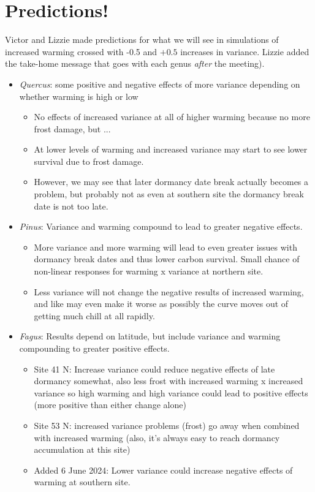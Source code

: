 \documentclass[11pt,letter]{article}
\begin{document}
\section{Predictions!}

Victor and Lizzie made predictions for what we will see in simulations of increased warming crossed with -0.5 and $+0.5$ increases in variance. Lizzie added the take-home message that goes with each genus \emph{after} the meeting). 

\begin{itemize}
\item \emph{Quercus}: some positive and negative effects of more variance depending on whether warming is high or low
\begin{itemize}
\item No effects of increased variance at all of higher warming because no more frost damage, but ...
\item At lower levels of warming and increased variance may start to see lower survival due to frost damage. 
\item However, we may see that later dormancy date break actually becomes a problem, but probably not as even at southern site the dormancy break date is not too late.
\end{itemize}
\item \emph{Pinus}: Variance and warming compound to lead to greater negative effects. 
\begin{itemize}
\item More variance and more warming will lead to even greater issues with dormancy break dates and thus lower carbon survival. Small chance of non-linear responses for warming x variance at northern site.
\item Less variance will not change the negative results of increased warming, and like may even make it worse as possibly the curve moves out of getting much chill at all rapidly. 
\end{itemize}
\item \emph{Fagus}: Results depend on latitude, but include variance and warming compounding to greater positive effects. 
\begin{itemize}
\item Site 41 N: Increase variance could reduce negative effects of late dormancy somewhat, also less frost with increased warming x increased variance so high warming and high variance could lead to positive effects (more positive than either change alone)
\item Site 53 N: increased variance problems (frost) go away when combined with increased warming (also, it's always easy to reach dormancy accumulation at this site)
\item Added 6 June 2024: Lower variance could increase negative effects of warming at southern site. 
\end{itemize}
\end{itemize}
\end{document}
